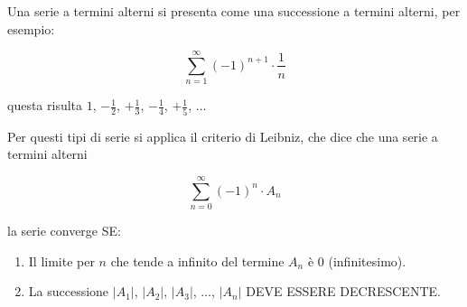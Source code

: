 \documentclass{article}
\begin{document}
\begin{Large}

Una serie a termini alterni si presenta come una successione a termini alterni, per esempio:

\[
\sum_{n=1}^{\infty} (-1)^{n+1} \cdot \frac{1}{n}
\]

questa risulta \(1\), \(-\frac{1}{2}\), \(+\frac{1}{3}\), \(-\frac{1}{4}\), \(+\frac{1}{5}\), \(\ldots\)

Per questi tipi di serie si applica il criterio di Leibniz, che dice che una serie a termini alterni

\[
\sum_{n=0}^{\infty} (-1)^{n} \cdot A_n
\]

la serie converge SE:

\begin{enumerate}
    \item Il limite per \(n\) che tende a infinito del termine \(A_n\) è 0 (infinitesimo).
    \item La successione \(|A_1|\), \(|A_2|\), \(|A_3|\), \(\ldots\), \(|A_n|\) DEVE ESSERE DECRESCENTE.
\end{enumerate}

\end{Large}
\end{document}
